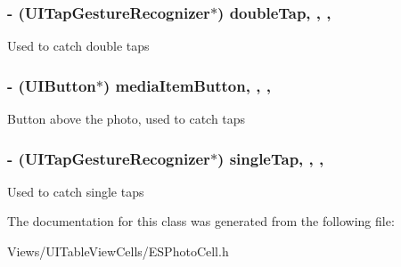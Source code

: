 \subsubsection[{double\+Tap}]{\setlength{\rightskip}{0pt plus 5cm}-\/ (U\+I\+Tap\+Gesture\+Recognizer$\ast$) double\+Tap\hspace{0.3cm}{\ttfamily [read]}, {\ttfamily [write]}, {\ttfamily [nonatomic]}, {\ttfamily [strong]}}\label{interface_e_s_photo_cell_a1d78b3d39f20fd1ce7ff9deaf2c3a168}
Used to catch double taps \hypertarget{interface_e_s_photo_cell_aeb1fe210b180b5d56627c1f6095a0921}{}
\subsubsection[{media\+Item\+Button}]{\setlength{\rightskip}{0pt plus 5cm}-\/ (U\+I\+Button$\ast$) media\+Item\+Button\hspace{0.3cm}{\ttfamily [read]}, {\ttfamily [write]}, {\ttfamily [nonatomic]}, {\ttfamily [strong]}}\label{interface_e_s_photo_cell_aeb1fe210b180b5d56627c1f6095a0921}
Button above the photo, used to catch taps \hypertarget{interface_e_s_photo_cell_a3d8dca4e8928cb7a2946551acd78c012}{}
\subsubsection[{single\+Tap}]{\setlength{\rightskip}{0pt plus 5cm}-\/ (U\+I\+Tap\+Gesture\+Recognizer$\ast$) single\+Tap\hspace{0.3cm}{\ttfamily [read]}, {\ttfamily [write]}, {\ttfamily [nonatomic]}, {\ttfamily [strong]}}\label{interface_e_s_photo_cell_a3d8dca4e8928cb7a2946551acd78c012}
Used to catch single taps 

The documentation for this class was generated from the following file\+:\begin{DoxyCompactItemize}
\item 
Views/\+U\+I\+Table\+View\+Cells/E\+S\+Photo\+Cell.\+h\end{DoxyCompactItemize}
